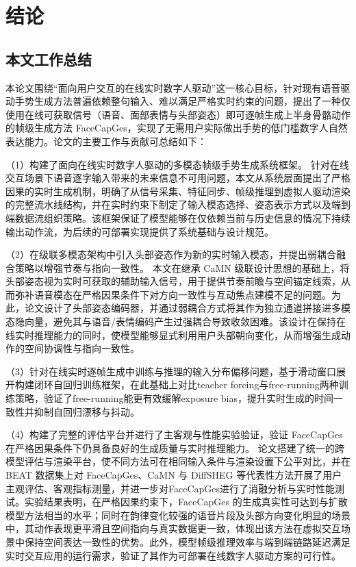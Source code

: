 
\chapter{结论}

\section{本文工作总结}

本论文围绕“面向用户交互的在线实时数字人驱动”这一核心目标，针对现有语音驱动手势生成方法普遍依赖整句输入、难以满足严格实时约束的问题，提出了一种仅使用在线可获取信号（语音、面部表情与头部姿态）即可逐帧生成上半身骨骼动作的帧级生成方法 FaceCapGes，实现了无需用户实际做出手势的低门槛数字人自然表达能力。论文的主要工作与贡献可总结如下：

（1）构建了面向在线实时数字人驱动的多模态帧级手势生成系统框架。
针对在线交互场景下语音逐字输入带来的未来信息不可用问题，本文从系统层面提出了严格因果的实时生成机制，明确了从信号采集、特征同步、帧级推理到虚拟人驱动渲染的完整流水线结构，并在实时约束下制定了输入模态选择、姿态表示方式以及端到端数据流组织策略。该框架保证了模型能够在仅依赖当前与历史信息的情况下持续输出动作流，为后续的可部署实现提供了系统基础与设计规范。

（2）在级联多模态架构中引入头部姿态作为新的实时输入模态，并提出弱耦合融合策略以增强节奏与指向一致性。
本文在继承 CaMN 级联设计思想的基础上，将头部姿态视为实时可获取的辅助输入信号，用于提供节奏前瞻与空间锚定线索，从而弥补语音模态在严格因果条件下对方向一致性与互动焦点建模不足的问题。为此，论文设计了头部姿态编码器，并通过弱耦合方式将其作为独立通道拼接进多模态隐向量，避免其与语音/表情编码产生过强耦合导致收敛困难。该设计在保持在线实时推理能力的同时，使模型能够显式利用用户头部朝向变化，从而增强生成动作的空间协调性与指向一致性。

（3）针对在线实时逐帧生成中训练与推理的输入分布偏移问题，基于滑动窗口展开构建闭环自回归训练框架，在此基础上对比teacher forcing与free-running两种训练策略，验证了free-running能更有效缓解exposure bias，提升实时生成的时间一致性并抑制自回归漂移与抖动。

（4）构建了完整的评估平台并进行了主客观与性能实验验证，验证 FaceCapGes 在严格因果条件下仍具备良好的生成质量与实时推理能力。
论文搭建了统一的跨模型评估与渲染平台，使不同方法可在相同输入条件与渲染设置下公平对比，并在 BEAT 数据集上对 FaceCapGes、CaMN 与 DiffSHEG 等代表性方法开展了用户主观评估、客观指标测量，并进一步对FaceCapGes进行了消融分析与实时性能测试。实验结果表明，在严格因果约束下，FaceCapGes 的生成真实性可达到与扩散模型方法相当的水平；同时在韵律变化较强的语音片段及头部方向变化明显的场景中，其动作表现更平滑且空间指向与真实数据更一致，体现出该方法在虚拟交互场景中保持空间表达一致性的优势。此外，模型帧级推理效率与端到端链路延迟满足实时交互应用的运行需求，验证了其作为可部署在线数字人驱动方案的可行性。

